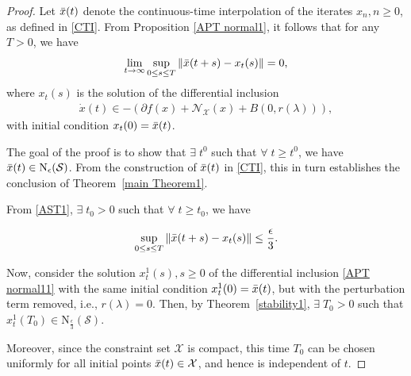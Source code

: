 \documentclass[9pt,journal,twoside,web]{ieeecolor}
\newcommand{\norm}[1]{\left\lVert #1 \right\rVert}
\begin{document}
\begin{proof}
    Let $\Bar{x}(t)$ denote the continuous-time interpolation of the iterates $x_n,n\geq 0$, as defined in \eqref{CTI}. From Proposition \ref{APT normal1}, it follows that for any $T > 0$, we have 
    \begin{equation}
\lim\limits_{t \to \infty}  \sup\limits_{0 \leq s \leq T} \norm{\Bar{x}(t+s)-x_t(s)} = 0,
\label{AST1}
\end{equation}
where $x_t(s)$ is the solution of the differential inclusion 
 \begin{equation}
    \begin{split}
        \Dot{x}(t) \in - (\partial f(x) + \mathcal{N}_\mathcal{X}(x) + B(0,r(\lambda))),
    \end{split}
    \label{APT normal11}
\end{equation}
with initial condition $x_t(0) = \Bar{x}(t)$. 

The goal of the proof is to show that $\exists \; t^0$ such that $\forall \; t \geq t^0$, we have $\Bar{x}(t) \in \mathrm{N}_\epsilon (\mathcal{S})$. From the construction of $\Bar{x}(t)$ in \eqref{CTI}, this in turn establishes the conclusion of Theorem~\ref{main Theorem1}.

From \eqref{AST1}, $\exists \; t_0 > 0$ such that $\forall \; t \geq t_0$, we have 

\begin{equation}
    \sup\limits_{0 \leq s \leq T} \norm{\Bar{x}(t+s)-x_t(s)} \leq \frac{\epsilon}{3}.
    \label{sup}
\end{equation}

Now, consider the solution $x_t^1 (s),s\geq 0$ of the differential inclusion \eqref{APT normal11} with the same initial condition $x_t^1(0) = \Bar{x}(t)$,  but with the perturbation term removed, i.e., $r(\lambda) = 0$. Then, by Theorem~\ref{stability1}, $\exists \; T_0>0$ such that $x_t^1(T_0) \in \mathrm{N}_{\frac{\epsilon}{3}} (\mathcal{S})$. 

Moreover, since the constraint set $\mathcal{X}$ is compact, this time $T_0$ can be chosen uniformly for all initial points $\Bar{x}(t) \in \mathcal{X}$, and hence is independent of $t$. 


\end{proof}
\end{document}
